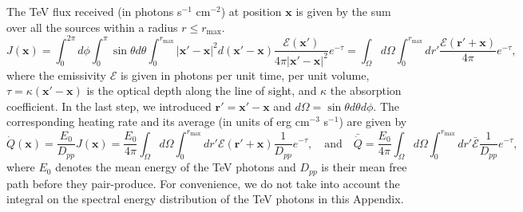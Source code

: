 \documentclass[twocolumns]{emulateapj}
\begin{document}
The TeV flux received (in photons s$^{-1}$ cm$^{-2}$) at position $\mathbf{x}$ is given by the sum over all the sources within a radius $r\leqslant r_{\mathrm{max}}$.
\begin{equation}
  \label{eq:flux_recu0}
  J(\mathbf{x})=
  \int_{0}^{2\pi}d\phi\int_{0}^{\pi}\sin\theta d\theta\int_0^{r_{\mathrm{max}}}|\mathbf{x}'-\mathbf{x}|^2 d(\mathbf{x}'-\mathbf{x})
  \frac{\mathcal{E}(\mathbf{x}') }{4\pi |\mathbf{x}'-\mathbf{x}|^2} e^{-\tau}
  =\int_{\Omega} d\Omega\int_0^{r_{\mathrm{max}}} dr' \frac{\mathcal{E}(\mathbf{r}'+\mathbf{x}) }{4\pi } e^{-\tau},
\end{equation}
where the emissivity $\mathcal{E}$ is given in photons per unit time, per unit volume, $\tau=\kappa (\mathbf{x}'-\mathbf{x})$ is the optical depth along the line of sight, and $\kappa$ the absorption coefficient. In the last step, we introduced $\mathbf{r'}=\mathbf{x}'-\mathbf{x}$ and $d\Omega=\sin\theta d\theta d\phi$. The corresponding heating rate and its average (in units of erg cm$^{-3}$ s$^{-1}$) are given by 
\begin{equation}
  \label{eq:heating_rate0}
  \dot{Q}(\mathbf{x})=\frac{E_0}{D_{pp}}J(\mathbf{x}) =
  \frac{E_0}{4\pi}   \int_{\Omega}d\Omega\int_0^{r_{\mathrm{max}}} dr' \mathcal{E}(\mathbf{r}'+\mathbf{x}) \frac{1}{D_{pp}} e^{-\tau},\quad\mbox{and}\quad
  \bar{\dot{Q}}= \frac{E_0}{4\pi}   \int_{\Omega}d\Omega\int_0^{r_{\mathrm{max}}} dr' \bar{\mathcal{E}} \frac{1}{D_{pp}} e^{-\tau},
\end{equation}
where $E_0$ denotes the mean energy of the TeV photons and $D_{pp}$ is their mean free path before they pair-produce. For convenience, we do not take into account the integral on the spectral energy distribution of the TeV photons in this Appendix. 
%
\end{document}
